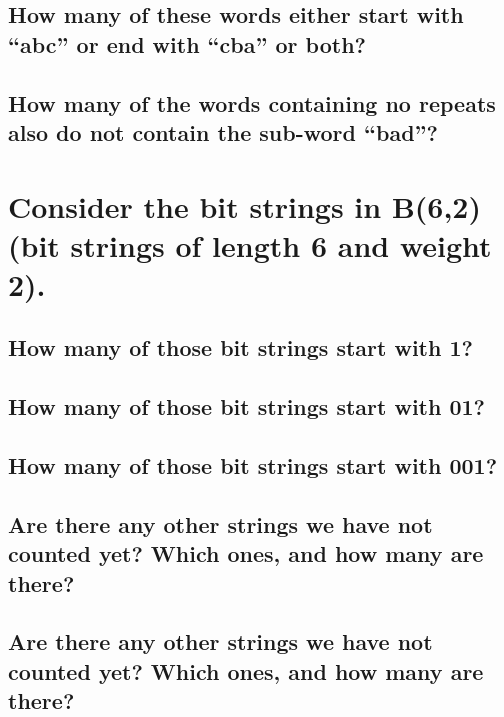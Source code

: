 \documentclass{article}
\begin{document}
\subsection{How many of these words either start with “abc” or end with “cba” or both?}
\subsection{How many of the words containing no repeats also do not contain the sub-word “bad”?}

\section{Consider the bit strings in B(6,2) (bit strings of length 6 and weight 2).}
\subsection{How many of those bit strings start with 1?}
\subsection{How many of those bit strings start with 01?}
\subsection{How many of those bit strings start with 001?}
\subsection{Are there any other strings we have not counted yet? Which ones, and how many are there?}
\subsection{Are there any other strings we have not counted yet? Which ones, and how many are there?}
\end{document}
